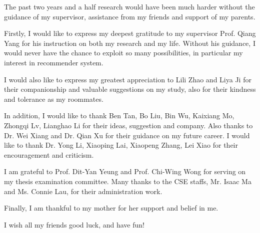 The past two years and a half research would have been much harder without the guidance of my supervisor, assistance from my friends and support of my parents.

Firstly, I would like to express my deepest gratitude to my supervisor Prof. Qiang Yang for his instruction on both my research and my life. Without his guidance, I would never have the chance to exploit so many possibilities, in particular my interest in recommender system.

I would also like to express my greatest appreciation to Lili Zhao and Liya Ji for their companionship and valuable suggestions on my study, also for their kindness and tolerance as my roommates.

In addition, I would like to thank Ben Tan, Bo Liu, Bin Wu, Kaixiang Mo, Zhongqi Lv, Lianghao Li for their ideas, suggestion and company. Also thanks to Dr. Wei Xiang and Dr. Qian Xu for their guidance on my future career. I would like to thank Dr. Yong Li, Xiaoping Lai, Xiaopeng Zhang, Lei Xiao for their encouragement and criticism.

I am grateful to Prof. Dit-Yan Yeung and Prof. Chi-Wing Wong for serving on my thesis examination committee. Many thanks to the CSE staffs, Mr. Isaac Ma and Ms. Connie Lau, for their administration work.

Finally, I am thankful to my mother for her support and belief in me.

I wish all my friends good luck, and have fun!


